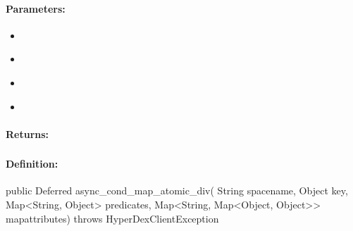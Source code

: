 \paragraph{Parameters:}
\begin{itemize}[noitemsep]
\item {}\\

\item {}\\

\item {}\\

\item {}\\

\end{itemize}

\paragraph{Returns:}


\pagebreak
\subsubsection{}
\label{api:java:async_cond_map_atomic_div}


\paragraph{Definition:}
\begin{javacode}
public Deferred async_cond_map_atomic_div(
        String spacename,
        Object key,
        Map<String, Object> predicates,
        Map<String, Map<Object, Object>> mapattributes) throws HyperDexClientException
\end{javacode}

